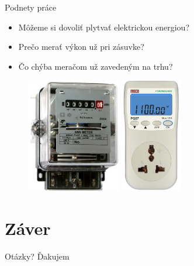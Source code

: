 \documentclass[hyperref={unicode}]{beamer}
\begin{document}
\begin{frame}{Podnety práce}
	\begin{itemize}
		\item Môžeme si dovoliť plytvať elektrickou energiou?
		\item Prečo merať výkon už pri zásuvke?
		\item Čo chýba meračom už zavedeným na trhu?
	\end{itemize}


	\begin{figure}[htp]
		\centering
		\includegraphics[height=5cm]{analog-power-meter}\hspace{1cm}
		\includegraphics[height=5cm]{digital-plug-meter}
	\end{figure}

\end{frame}




\section{Záver}

\begin{frame}{Otázky?}
	\centering
	{\Large Ďakujem}
\end{frame}
\end{document}
